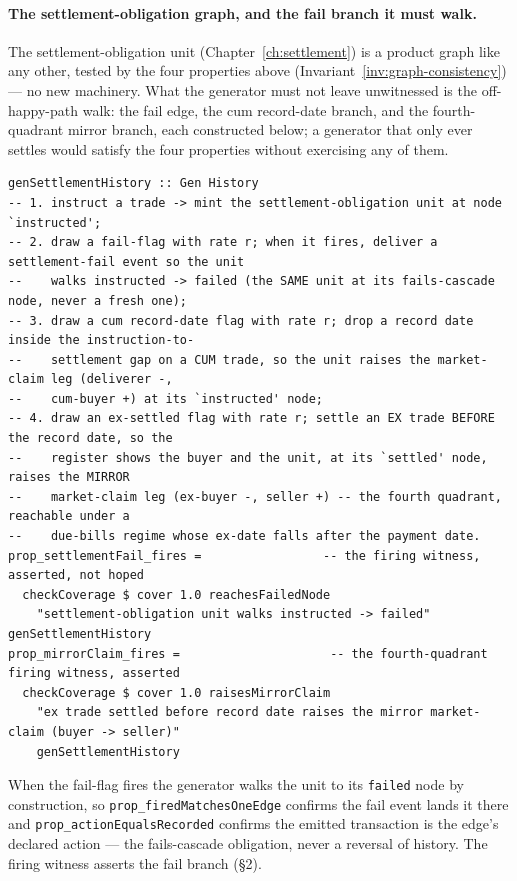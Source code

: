 \documentclass[11pt,a4paper]{article}
\begin{document}
\paragraph{The settlement-obligation graph, and the fail branch it must walk.} The
settlement-obligation unit (Chapter~\ref{ch:settlement}) is a product graph like any
other, tested by the four properties above (Invariant~\ref{inv:graph-consistency}) --- no
new machinery. What the generator must not leave unwitnessed is the off-happy-path walk:
the fail edge, the cum record-date branch, and the fourth-quadrant mirror branch, each
constructed below; a generator that only ever settles would satisfy the four properties
without exercising any of them.

\begin{lstlisting}
genSettlementHistory :: Gen History
-- 1. instruct a trade -> mint the settlement-obligation unit at node `instructed';
-- 2. draw a fail-flag with rate r; when it fires, deliver a settlement-fail event so the unit
--    walks instructed -> failed (the SAME unit at its fails-cascade node, never a fresh one);
-- 3. draw a cum record-date flag with rate r; drop a record date inside the instruction-to-
--    settlement gap on a CUM trade, so the unit raises the market-claim leg (deliverer -,
--    cum-buyer +) at its `instructed' node;
-- 4. draw an ex-settled flag with rate r; settle an EX trade BEFORE the record date, so the
--    register shows the buyer and the unit, at its `settled' node, raises the MIRROR
--    market-claim leg (ex-buyer -, seller +) -- the fourth quadrant, reachable under a
--    due-bills regime whose ex-date falls after the payment date.
prop_settlementFail_fires =                 -- the firing witness, asserted, not hoped
  checkCoverage $ cover 1.0 reachesFailedNode
    "settlement-obligation unit walks instructed -> failed" genSettlementHistory
prop_mirrorClaim_fires =                     -- the fourth-quadrant firing witness, asserted
  checkCoverage $ cover 1.0 raisesMirrorClaim
    "ex trade settled before record date raises the mirror market-claim (buyer -> seller)"
    genSettlementHistory
\end{lstlisting}

When the fail-flag fires the generator walks the unit to its \texttt{failed} node by
construction, so \texttt{prop\_firedMatchesOneEdge} confirms the fail event lands it there
and \texttt{prop\_actionEqualsRecorded} confirms the emitted transaction is the edge's
declared action --- the fails-cascade obligation, never a reversal of history. The firing
witness asserts the fail branch (\S 2).
\end{document}
